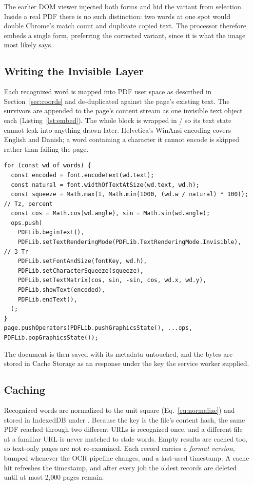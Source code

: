 The earlier DOM viewer injected both forms and hid the variant from selection.
Inside a real PDF there is no such distinction: two words at one spot would
double Chrome's match count and duplicate copied text. The processor therefore
embeds a single form, preferring the corrected variant, since it is what the
image most likely says.

\subsection{Writing the Invisible Layer}
Each recognized word is mapped into PDF user space as described in
Section~\ref{sec:coords} and de-duplicated against the page's existing text.
The survivors are appended to the page's content stream as one invisible text
object each (Listing~\ref{lst:embed}). The whole block is wrapped in
/ so its text state cannot leak into anything drawn later.
Helvetica's WinAnsi encoding covers English and Danish; a word containing a
character it cannot encode is skipped rather than failing the page.

\begin{lstlisting}[caption={Writing one invisible, width-matched text object per word with pdf-lib (\code{embed.js}).}, label={lst:embed}]
for (const wd of words) {
  const encoded = font.encodeText(wd.text);
  const natural = font.widthOfTextAtSize(wd.text, wd.h);
  const squeeze = Math.max(1, Math.min(1000, (wd.w / natural) * 100));  // Tz, percent
  const cos = Math.cos(wd.angle), sin = Math.sin(wd.angle);
  ops.push(
    PDFLib.beginText(),
    PDFLib.setTextRenderingMode(PDFLib.TextRenderingMode.Invisible),     // 3 Tr
    PDFLib.setFontAndSize(fontKey, wd.h),
    PDFLib.setCharacterSqueeze(squeeze),
    PDFLib.setTextMatrix(cos, sin, -sin, cos, wd.x, wd.y),
    PDFLib.showText(encoded),
    PDFLib.endText(),
  );
}
page.pushOperators(PDFLib.pushGraphicsState(), ...ops, PDFLib.popGraphicsState());
\end{lstlisting}

The document is then saved with its metadata untouched, and the bytes are
stored in Cache Storage as an  response under the key the
service worker supplied.

\subsection{Caching}
Recognized words are normalized to the unit square (Eq.~\eqref{eq:normalize}) and
stored in IndexedDB under . Because the key is the
file's content hash, the same PDF reached through two different URLs is
recognized once, and a different file at a familiar URL is never matched to
stale words. Empty results are cached too, so text-only pages are not re-examined.
Each record carries a \emph{format version}, bumped whenever the OCR pipeline
changes, and a last-used timestamp. A cache hit refreshes the timestamp, and
after every job the oldest records are deleted until at most 2{,}000 pages
remain.

